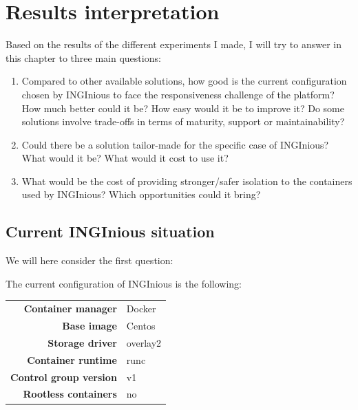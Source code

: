 \chapter{Results interpretation}

Based on the results of the different experiments I made, I will try to answer in this chapter to three main questions:
\begin{enumerate}
  \item Compared to other available solutions, how good is the current configuration chosen by INGInious to face the responsiveness challenge of the platform?  How much better could it be?  How easy would it be to improve it?  Do some solutions involve trade-offs in terms of maturity, support or maintainability?
  \item Could there be a solution tailor-made for the specific case of INGInious?  What would it be?  What would it cost to use it?
  \item What would be the cost of providing stronger/safer isolation to the containers used by INGInious?  Which opportunities could it bring?
\end{enumerate}

\section{Current INGInious situation}
We will here consider the first question:
\begin{center}
\end{center}

The current configuration of INGInious is the following:
\begin{center}
\begin{tabular}{rl}
  \textbf{Container manager} & Docker \\
  \textbf{Base image} & Centos \\
  \textbf{Storage driver} & overlay2 \\
  \textbf{Container runtime} & runc \\
  \textbf{Control group version} & v1 \\
  \textbf{Rootless containers} & no \\
\end{tabular}
\end{center}

